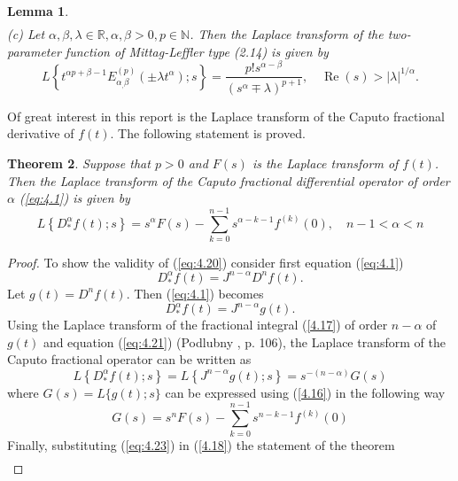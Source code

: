 \documentclass[a4paper,14pt,oneside]{book}
\theoremstyle{plain}
\newtheorem{thm}{Theorem}[section]
\newtheorem{lem}[thm]{Lemma}
\theoremstyle{definition}
\theoremstyle{remark}
\begin{document}
\begin{center}
\begin{flushleft}
{\begin{lem}
\begin{equation}
\begin{aligned}
\end{aligned}
\end{equation}
(c) Let $\alpha, \beta, \lambda \in \mathbb{R}, \alpha, \beta>0, p \in \mathbb{N}$. Then the Laplace transform of the two-parameter function of Mittag-Leffler type (2.14) is given by
\begin{equation}\label{4.19}
L\left\{t^{\alpha p+\beta-1} E_{\alpha_{,} \beta}^{(p)}\left(\pm \lambda t^{\alpha}\right) ; s\right\}=\frac{p ! s^{\alpha-\beta}}{\left(s^{\alpha} \mp \lambda\right)^{p+1}}, \quad \operatorname{Re}(s)>|\lambda|^{1 / \alpha} .
\end{equation}
\end{lem}
Of great interest in this report is the Laplace transform of the Caputo fractional derivative of $f(t)$. The following statement is proved.
\begin{thm} 
Suppose that $p>0$ and $F(s)$ is the Laplace transform of $f(t)$. Then the Laplace transform of the Caputo fractional differential operator of order $\alpha $ (\ref{eq:4.1}) is given by
\begin{equation}\label{eq:4.20}
L\left\{D_{*}^{\alpha} f(t) ; s\right\}=s^{\alpha} F(s)-\sum_{k=0}^{n-1} s^{\alpha-k-1} f^{(k)}(0), \quad n-1<\alpha<n
\end{equation}
\end{thm}
\begin{proof} To show the validity of (\ref{eq:4.20}) consider first equation (\ref{eq:4.1})
$$
D_{*}^{\alpha} f(t)=J^{n-\alpha} D^{n} f(t) .
$$
Let $g(t) =D^{n} f(t)$. Then (\ref{eq:4.1}) becomes
\begin{equation}\label{eq:4.21}
D_{*}^{\alpha} f(t)=J^{n-\alpha} g(t) .
\end{equation}
Using the Laplace transform of the fractional integral (\ref{4.17}) of order $n-\alpha$ of $g(t)$ and equation (\ref{eq:4.21}) (Podlubny \cite{bb2}, p. 106), the Laplace transform of the Caputo fractional operator can be written as
\begin{equation}\label{eq:4.22}
L\left\{D_{*}^{\alpha} f(t) ; s\right\}=L\left\{J^{n-\alpha} g(t) ; s\right\}=s^{-(n-\alpha)} G(s)
\end{equation}
where $G(s)=L\{g(t) ; s\}$ can be expressed using (\ref{4.16}) in the following way
\begin{equation}\label{eq:4.23}
G(s)=s^{n} F(s)-\sum_{k=0}^{n-1} s^{n-k-1} f^{(k)}(0)
\end{equation}
Finally, substituting (\ref{eq:4.23}) in (\ref{4.18}) the statement of the theorem
$$
\begin{aligned}

\end{aligned}$$
\end{proof}}
\end{flushleft}
\end{center}
\end{document}
